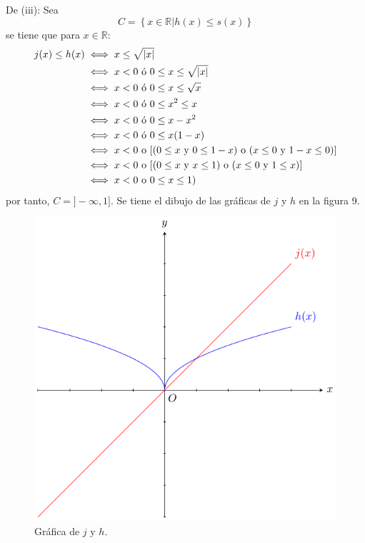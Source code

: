 \documentclass[12pt]{article}
\begin{document}
\begin{enumerate}
\begin{sol}
        De (iii): Sea
        \begin{equation*}
            C=\left\{x\in\mathbb{R}\Big| h(x)\leq s(x) \right\}
        \end{equation*}
        se tiene que para $x\in\mathbb{R}$:
        \begin{equation*}
            \begin{split}
                j(x)\leq h(x)&\iff x\leq \sqrt{\left| x \right|} \\
                &\iff x<0 \textup{ ó }0\leq x\leq\sqrt{\left| x \right|} \\
                &\iff x<0 \textup{ ó }0\leq x\leq\sqrt{x} \\
                &\iff x<0 \textup{ ó }0\leq x^2\leq x \\
                &\iff x<0 \textup{ ó }0\leq x-x^2 \\
                &\iff x<0 \textup{ ó }0\leq x(1-x)\\
                &\iff x<0 \textup{ o }[(0\leq x \textup{ y }0\leq 1-x)\textup{ o }(x\leq 0\textup{ y }1-x\leq0)]\\
                &\iff x<0 \textup{ o }[(0\leq x \textup{ y }x\leq 1)\textup{ o }(x\leq 0\textup{ y }1\leq x)]\\
                &\iff x<0 \textup{ o } 0\leq x\leq 1)\\
            \end{split}
        \end{equation*}
        por tanto, $C=]-\infty, 1]$. Se tiene el dibujo de las gráficas de $j$ y $h$ en la figura 9.
        \begin{figure}
            \begin{center}
                \includegraphics[scale=1]{images/3_11_3.pdf}
            \end{center}
            \caption{Gráfica de $j$ y $h$.}
        \end{figure}
    \end{sol}


\end{enumerate}
\end{document}
